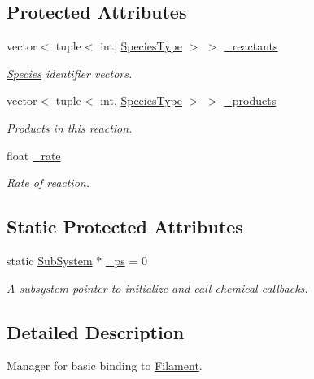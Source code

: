 \subsection*{Protected Attributes}
\begin{DoxyCompactItemize}
\item 
vector$<$ tuple$<$ int, \hyperlink{Species_8h_a50651af47c56ea0e27235468d23542cf}{Species\+Type} $>$ $>$ \hyperlink{classInternalFilamentRxnManager_a63de9061c3da4ad03cf4c530d2774979}{\+\_\+reactants}
\begin{DoxyCompactList}\small\item\em \hyperlink{classSpecies}{Species} identifier vectors. \end{DoxyCompactList}\item 
vector$<$ tuple$<$ int, \hyperlink{Species_8h_a50651af47c56ea0e27235468d23542cf}{Species\+Type} $>$ $>$ \hyperlink{classInternalFilamentRxnManager_afd213da1a3706e2e88962e5da886a5dc}{\+\_\+products}
\begin{DoxyCompactList}\small\item\em Products in this reaction. \end{DoxyCompactList}\item 
float \hyperlink{classInternalFilamentRxnManager_a8b98dd9e6f5d016149f5434b891806df}{\+\_\+rate}
\begin{DoxyCompactList}\small\item\em Rate of reaction. \end{DoxyCompactList}\end{DoxyCompactItemize}
\subsection*{Static Protected Attributes}
\begin{DoxyCompactItemize}
\item 
static \hyperlink{classSubSystem}{Sub\+System} $\ast$ \hyperlink{classInternalFilamentRxnManager_a973ce9cc2aae811e6867afa46193c5f2}{\+\_\+ps} = 0
\begin{DoxyCompactList}\small\item\em A subsystem pointer to initialize and call chemical callbacks. \end{DoxyCompactList}\end{DoxyCompactItemize}


\subsection{Detailed Description}
Manager for basic binding to \hyperlink{classFilament}{Filament}. 

